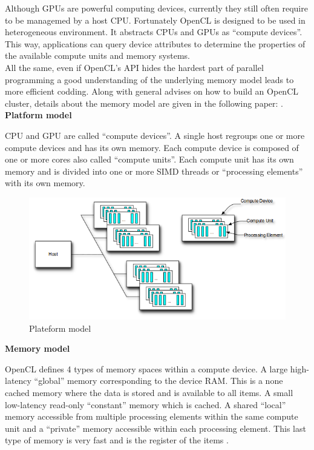 Although GPUs are powerful computing devices, currently they still often
require to be managemed by a host CPU. Fortunately OpenCL is designed to be used in
heterogeneous environment. It abstracts CPUs and GPUs as “compute devices”.
This way, applications can query device attributes to determine the
properties of the available compute units and memory systems.
\citep{Reference5}\\

All the same, even if OpenCL's API hides the hardest part of parallel
programming a good understanding of the underlying memory model leads to more
efficient codding. Along with general advises on how to build an OpenCL
cluster, details about the memory model are given in the following paper:
\citep{Reference4}.\\

\textbf{Platform model}

CPU and GPU are called “compute devices”. A single host regroups one or more
compute devices and has its own memory. Each compute device is composed of one
or more cores also called “compute units”. Each compute unit has its own memory
and is divided into one or more SIMD threads or “processing elements” with its
own memory. \citep{Reference4}\\

\begin{figure}[H] \centering
\includegraphics[width=\textwidth]{./Figures/plateform_model.png}
\caption[Plateform model]{Plateform model \citep{Reference4}}
\label{fig:plateform_model} \end{figure}


\textbf{Memory model}

OpenCL defines 4 types of memory spaces within a compute device. A large
high-latency “global” memory corresponding to the device RAM. This is a none
cached memory  where the data is stored and is available to all items. A small
low-latency read-only “constant” memory which is cached. A shared “local”
memory accessible from multiple processing elements within the same compute
unit and a “private” memory accessible within each processing element. This
last type of memory is very fast and is the register of the items
\citep{Reference4}.\\

